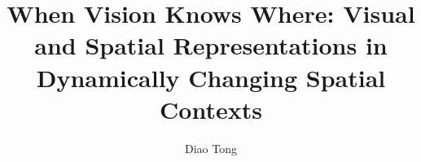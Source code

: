 
\title{When Vision Knows Where: Visual and Spatial Representations in Dynamically Changing Spatial Contexts}
\author{Diao Tong}

\maketitle
\makedeclaration

